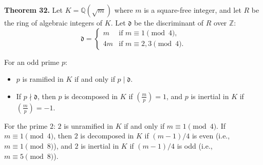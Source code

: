 \textbf{Theorem 32.} Let $K = \mathbb{Q}(\sqrt{m})$ where $m$ is a square-free integer, and let $R$ be the ring of algebraic integers of $K$. Let $\mathfrak{d}$ be the discriminant of $R$ over $\mathbb{Z}$:
$$\mathfrak{d} = \begin{cases}
m & \text{if } m \equiv 1 \pmod{4},\\
4m & \text{if } m \equiv 2, 3 \pmod{4}.
\end{cases}$$

For an odd prime $p$:
\begin{itemize}
\item $p$ is ramified in $K$ if and only if $p \mid \mathfrak{d}$.
\item If $p \nmid \mathfrak{d}$, then $p$ is decomposed in $K$ if $\left(\frac{m}{p}\right) = 1$, and $p$ is inertial in $K$ if $\left(\frac{m}{p}\right) = -1$.
\end{itemize}

For the prime $2$: $2$ is unramified in $K$ if and only if $m \equiv 1 \pmod{4}$. If $m \equiv 1 \pmod{4}$, then $2$ is decomposed in $K$ if $(m-1)/4$ is even (i.e., $m \equiv 1 \pmod{8}$), and $2$ is inertial in $K$ if $(m-1)/4$ is odd (i.e., $m \equiv 5 \pmod{8}$).
